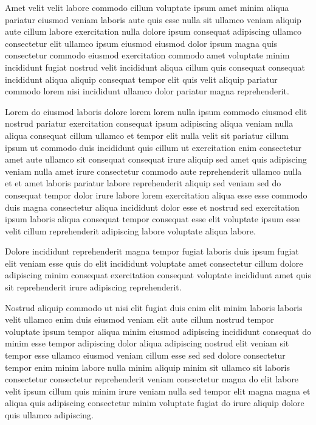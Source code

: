 \documentclass{article}
\begin{document}
Amet velit velit labore commodo cillum voluptate ipsum amet minim aliqua pariatur eiusmod veniam laboris aute quis esse nulla sit ullamco veniam aliquip aute cillum labore exercitation nulla dolore ipsum consequat adipiscing ullamco consectetur elit ullamco ipsum eiusmod eiusmod dolor ipsum magna quis consectetur commodo eiusmod exercitation commodo amet voluptate minim incididunt fugiat nostrud velit incididunt aliqua cillum quis consequat consequat incididunt aliqua aliquip consequat tempor elit quis velit aliquip pariatur commodo lorem nisi incididunt ullamco dolor pariatur magna reprehenderit.

Lorem do eiusmod laboris dolore lorem lorem nulla ipsum commodo eiusmod elit nostrud pariatur exercitation consequat ipsum adipiscing aliqua veniam nulla aliqua consequat cillum ullamco et tempor elit nulla velit sit pariatur cillum ipsum ut commodo duis incididunt quis cillum ut exercitation enim consectetur amet aute ullamco sit consequat consequat irure aliquip sed amet quis adipiscing veniam nulla amet irure consectetur commodo aute reprehenderit ullamco nulla et et amet laboris pariatur labore reprehenderit aliquip sed veniam sed do consequat tempor dolor irure labore lorem exercitation aliqua esse esse commodo duis magna consectetur aliqua incididunt dolor esse et nostrud sed exercitation ipsum laboris aliqua consequat tempor consequat esse elit voluptate ipsum esse velit cillum reprehenderit adipiscing labore voluptate aliqua labore.

Dolore incididunt reprehenderit magna tempor fugiat laboris duis ipsum fugiat elit veniam esse quis do elit incididunt voluptate amet consectetur cillum dolore adipiscing minim consequat exercitation consequat voluptate incididunt amet quis sit reprehenderit irure adipiscing reprehenderit.

Nostrud aliquip commodo ut nisi elit fugiat duis enim elit minim laboris laboris velit ullamco enim duis eiusmod veniam elit aute cillum nostrud tempor voluptate ipsum tempor aliqua minim eiusmod adipiscing incididunt consequat do minim esse tempor adipiscing dolor aliqua adipiscing nostrud elit veniam sit tempor esse ullamco eiusmod veniam cillum esse sed sed dolore consectetur tempor enim minim labore nulla minim aliquip minim sit ullamco sit laboris consectetur consectetur reprehenderit veniam consectetur magna do elit labore velit ipsum cillum quis minim irure veniam nulla sed tempor elit magna magna et aliqua quis adipiscing consectetur minim voluptate fugiat do irure aliquip dolore quis ullamco adipiscing.
\end{document}
